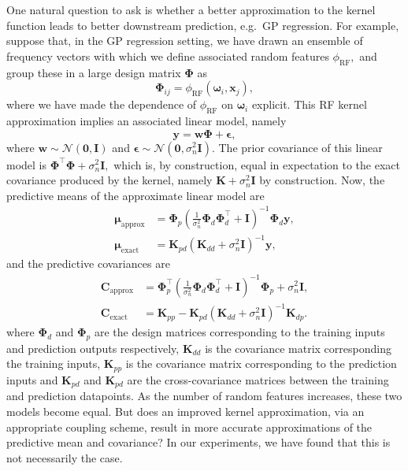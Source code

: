 One natural question to ask is whether a better approximation to the kernel function leads to better downstream prediction, e.g.~GP regression.
For example, suppose that, in the GP regression setting, we have drawn an ensemble of frequency vectors with which we define associated random features $\phi_{\text{RF}},$ and group these in a large design matrix $\boldsymbol{\Phi}$ as
\begin{equation}
    \boldsymbol{\Phi}_{ij} = \phi_{\text{RF}}(\boldsymbol{\omega}_i, \boldsymbol{x}_j),
\end{equation}
where we have made the dependence of $\phi_{\text{RF}}$ on $\boldsymbol{\omega}_i$ explicit.
This RF kernel approximation implies an associated linear model, namely 
\begin{equation}
    \boldsymbol{y} = \boldsymbol{w} \boldsymbol{\Phi} + \boldsymbol{\epsilon},
\end{equation}
where $\boldsymbol{w} \sim \mathcal{N}(\boldsymbol{0}, \boldsymbol{I})$ and $\boldsymbol{\epsilon} \sim \mathcal{N}(\boldsymbol{0}, \sigma_n^2\boldsymbol{I}).$
The prior covariance of this linear model is $\boldsymbol{\Phi}^\top \boldsymbol{\Phi}  + \sigma_n^2 \boldsymbol{I},$ which is, by construction, equal in expectation to the exact covariance produced by the kernel, namely $\boldsymbol{K} + \sigma_n^2 \boldsymbol{I}$ by construction.
Now, the predictive means of the approximate linear model are
\begin{align} \label{eq:mua1}
    \boldsymbol{\mu}_{\text{approx}} &= \boldsymbol{\Phi}_p\left(\frac{1}{\sigma_n^2}\boldsymbol{\Phi}_d \boldsymbol{\Phi}_d^\top + \boldsymbol{I}\right)^{-1}\boldsymbol{\Phi}_d\boldsymbol{y}, \\
    \boldsymbol{\mu}_{\text{exact}} &= \boldsymbol{K}_{pd} (\boldsymbol{K}_{dd} + \sigma_n^2 \boldsymbol{I})^{-1}\boldsymbol{y},
\end{align}
and the predictive covariances are
\begin{align} \label{eq:Ca1}
    \boldsymbol{C}_{\text{approx}} &= \boldsymbol{\Phi}_p^\top \left(\frac{1}{\sigma_n^2}\boldsymbol{\Phi}_d \boldsymbol{\Phi}_d^\top + \boldsymbol{I}\right)^{-1} \boldsymbol{\Phi}_p + \sigma_n^2 \boldsymbol{I}, \\
    \boldsymbol{C}_{\text{exact}} &= \boldsymbol{K}_{pp} - \boldsymbol{K}_{pd} (\boldsymbol{K}_{dd} + \sigma_n^2 \boldsymbol{I})^{-1}\boldsymbol{K}_{dp}.
\end{align}
where $\boldsymbol{\Phi}_d$ and $\boldsymbol{\Phi}_p$ are the design matrices corresponding to the training inputs and prediction outputs respectively, $\boldsymbol{K}_{dd}$ is the covariance matrix corresponding the training inputs, $\boldsymbol{K}_{pp}$ is the covariance matrix corresponding to the prediction inputs and $\boldsymbol{K}_{pd}$ and $\boldsymbol{K}_{pd}$ are the cross-covariance matrices between the training and prediction datapoints.
As the number of random features increases, these two models become equal.
But does an improved kernel approximation, via an appropriate coupling scheme, result in more accurate approximations of the predictive mean and covariance?
In our experiments, we have found that this is not necessarily the case.

